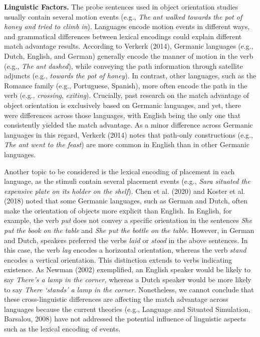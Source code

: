 \documentclass[
  man,floatsintext]{apa7}
\begin{document}
\textbf{Linguistic Factors.} The probe sentences used in object orientation
studies usually contain several motion events (e.g., \emph{The ant walked
towards the pot of honey and tried to climb in}). Languages encode
motion events in different ways, and grammatical differences between
lexical encodings could explain different match advantage results.
According to Verkerk (2014), Germanic languages (e.g., Dutch, English, and
German) generally encode the manner of motion in the verb (e.g., \emph{The
ant dashed}), while conveying the path information through satellite
adjuncts (e.g., \emph{towards the pot of honey}). In contrast, other
languages, such as the Romance family (e.g., Portuguese, Spanish), more
often encode the path in the verb (e.g., \emph{crossing}, \emph{exiting}).
Crucially, past research on the match advantage of object orientation is
exclusively based on Germanic languages, and yet, there were differences
across those languages, with English being the only one that
consistently yielded the match advantage. As a minor difference across
Germanic languages in this regard, Verkerk (2014) notes that path-only
constructions (e.g., \emph{The ant went to the feast}) are more common in
English than in other Germanic languages.

Another topic to be considered is the lexical encoding of placement in
each language, as the stimuli contain several placement events (e.g.,
\emph{Sara situated the expensive plate on its holder on the shelf}).
Chen et al. (2020) and Koster et al. (2018) noted that
some Germanic languages, such as German and Dutch, often make the
orientation of objects more explicit than English. In English, for
example, the verb \emph{put} does not convey a specific orientation in the
sentences \emph{She put the book on the table} and \emph{She put the bottle on the
table.} However, in German and Dutch, speakers preferred the verbs
\emph{laid} or \emph{stood} in the above sentences. In this case, the verb \emph{lay}
encodes a horizontal orientation, whereas the verb \emph{stand} encodes a
vertical orientation. This distinction extends to verbs indicating
existence. As Newman (2002) exemplified, an
English speaker would be likely to say \emph{There's a lamp in the corner,}
whereas a Dutch speaker would be more likely to say \emph{There `stands' a
lamp in the corner.} Nonetheless, we cannot conclude that these
cross-linguistic differences are affecting the match advantage across
languages because the current theories (e.g., Language and Situated
Simulation, Barsalou, 2008) have not addressed the potential
influence of linguistic aspects such as the lexical encoding of events.
\end{document}
